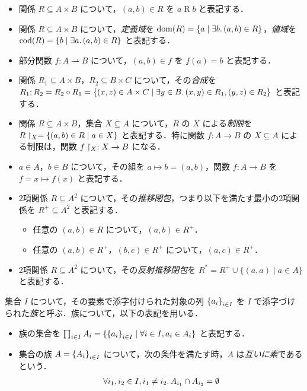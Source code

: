 \begin{itemize}
  \item 関係 $R \subseteq A \times B$ について，$(a, b) \in R$ を $a \mathrel{R} b$ と表記する．
  \item 関係 $R \subseteq A \times B$ について，\emph{定義域}を $\dom(R) = \{a \mid \exists b\ldotp (a, b) \in R\}$，\emph{値域}を $\cod(R) = \{b \mid \exists a\ldotp (a, b) \in R\}$ と表記する．
  \item 部分関数 $f: A \rightharpoonup B$ について，$(a, b) \in f$ を $f(a) = b$ と表記する．
  \item 関係 $R_1 \subseteq A \times B$，$R_2 \subseteq B \times C$ について，その\emph{合成}を $R_1; R_2 = R_2 \circ R_1 = \{(x, z) \in A \times C \mid \exists y \in B\ldotp (x, y) \in R_1, (y, z) \in R_2\}$ と表記する．
  \item 関係 $R \subseteq A \times B$，集合 $X \subseteq A$ について，$R$ の $X$ による\emph{制限}を $R\restrict_X = \{(a, b) \in R \mid a \in X\}$ と表記する．特に関数 $f: A \to B$ の $X \subseteq A$ による制限は，関数 $f\restrict_X: X \to B$ になる．
  \item $a \in A$，$b \in B$ について，その組を $a \mapsto b = (a, b)$，関数 $f: A \to B$ を $f = x \mapsto f(x)$ と表記する．
  \item 2項関係 $R \subseteq A^2$ について，その\emph{推移閉包}，つまり以下を満たす最小の2項関係を $R^+ \subseteq A^2$ と表記する．
  \begin{itemize}
    \item 任意の $(a, b) \in R$ について，$(a, b) \in R^+$．
    \item 任意の $(a, b) \in R^+$，$(b, c) \in R^+$ について，$(a, c) \in R^+$．
  \end{itemize}
  \item 2項関係 $R \subseteq A^2$ について，その\emph{反射推移閉包}を $R^* = R^+ \cup \{(a, a) \mid a \in A\}$ と表記する．
\end{itemize}

集合 $I$ について，その要素で添字付けられた対象の列 $\indexedfamily{i \in I}{a_i}$ を $I$ で添字づけられた\emph{族}と呼ぶ．族について，以下の表記を用いる．
\begin{itemize}
  \item 族の集合を $\indexedfamilyclass{i \in I}{A_i} = \{\indexedfamily{i \in I}{a_i} \mid \forall i \in I, a_i \in A_i\}$ と表記する．
  \item 集合の族 $A = \indexedfamily{i \in I}{A_i}$ について，次の条件を満たす時，$A$ は\emph{互いに素}であるという．
  \begin{align*}
    \forall i_1, i_2 \in I, i_1 \neq i_2\ldotp A_{i_1} \cap A_{i_2} = \emptyset
  \end{align*}
\end{itemize}
